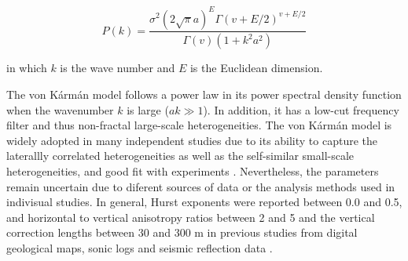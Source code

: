 \begin{equation}\label{eq:app-A2}
    P(k)=\frac{\sigma^{2}(2 \sqrt{\pi} a)^{E} \Gamma(v+E / 2)^{v+E / 2}}{\Gamma(v)\left(1+k^{2} a^{2}\right)}
\end{equation}

\noindent in which $k$ is the wave number and $E$ is the Euclidean dimension.

The von K\'arm\'an model follows a power law in its power spectral density function when the wavenumber $k$ is large ($ak \gg 1$). In addition, it has a low-cut frequency filter and thus non-fractal large-scale heterogeneities. The von K\'arm\'an model is widely adopted in many independent studies due to its ability to capture the laterallly correlated heterogeneities as well as the self-similar small-scale heterogeneities, and good fit with experiments \citep{ru1982attenuation,carpentier2009conservation,nakata2015stochastic}. Nevertheless, the parameters remain uncertain due to diferent sources of data or the analysis methods used in indivisual studies. In general, Hurst exponents were reported between 0.0 and 0.5, and horizontal to vertical anisotropy ratios between 2 and 5 and the vertical correction lengths between 30 and 300 m in previous studies from digital geological maps, sonic logs and seismic reflection data \citep[e.g., ][ and the references therein]{nakata2015stochastic,savranModelSmallscaleCrustal2016}.







